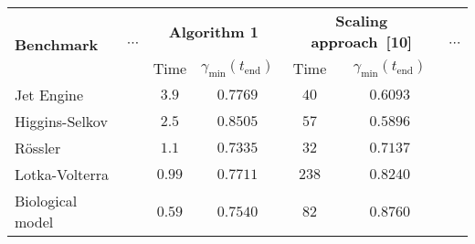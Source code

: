 

\begin{footnotesize}
\begin{tabular}{l c c c c c c}
    \toprule
    \multirow{2}{*}{\textbf{Benchmark}} & \multirow{2}{*}{$\cdots$} & \multicolumn{2}{c}{\textbf{Algorithm 1}} & \multicolumn{2}{c}{\textbf{Scaling approach~[10]}} & \multirow{2}{*}{$\cdots$} \\
    & & Time & $\gamma_{\min}(t_{\text{end}})$ & Time & $\gamma_{\min}(t_{\text{end}})$ & \\ \midrule
    Jet Engine & & $3.9$ & $0.7769$ & $40$ & $0.6093$ & \\
    Higgins-Selkov & & $2.5$ & $0.8505$ & $57$ & $0.5896$ & \\
    Rössler & & $1.1$ & $0.7335$ & $32$ & $0.7137$ & \\
    Lotka-Volterra & & $0.99$ & $0.7711$ & $238$ & $0.8240$ & \\
    Biological model & & $0.59$ & $0.7540$ & $82$ & $0.8760$ & \\
    \bottomrule
\end{tabular}
\end{footnotesize}